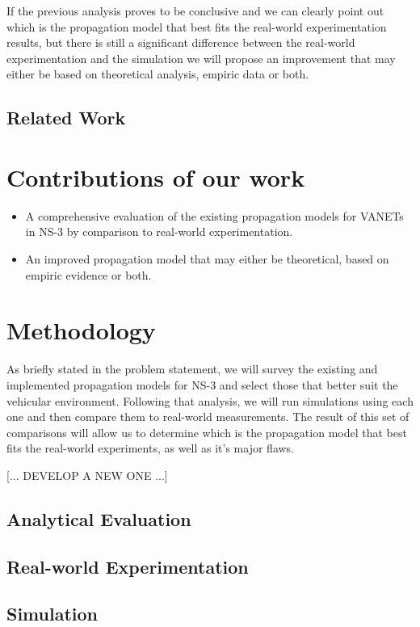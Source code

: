 \documentclass[12pt]{article}
\begin{document}
If the previous analysis proves to be conclusive and we can clearly point out which is the propagation model that best fits the real-world experimentation results, but there is still a significant difference between the real-world experimentation and the simulation we will propose an improvement that may either be based on theoretical analysis, empiric data or both.

\subsection{Related Work}

\section{Contributions of our work}
\begin{itemize}
	\item A comprehensive evaluation of the existing propagation models for VANETs in NS-3 by comparison to real-world experimentation.
	\item An improved propagation model that may either be theoretical, based on empiric evidence or both.
\end{itemize}
\section{Methodology}
As briefly stated in the problem statement, we will survey the existing and implemented propagation models for NS-3 and select those that better suit the vehicular environment. Following that analysis, we will run simulations using each one and then compare them to real-world measurements. The result of this set of comparisons will allow us to determine which is the propagation model that best fits the real-world experiments, as well as it's major flaws.

[... DEVELOP A NEW ONE ...]
\subsection{Analytical Evaluation}

\subsection{Real-world Experimentation}

\subsection{Simulation}
\end{document}
